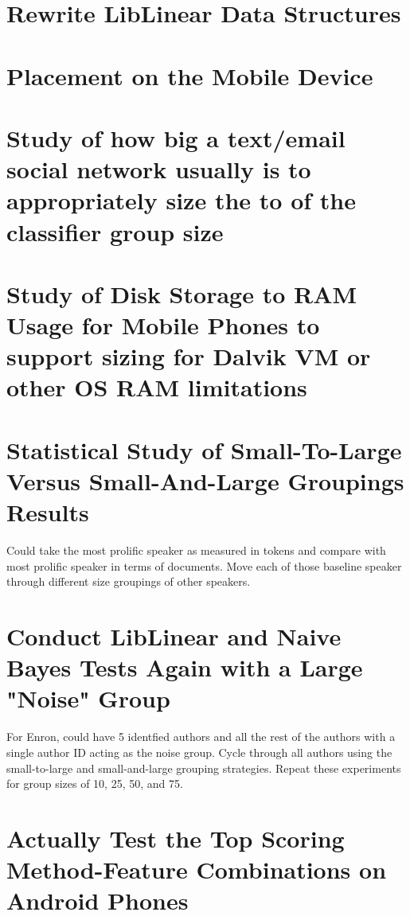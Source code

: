 \section{Rewrite LibLinear Data Structures}

\section{Placement on the Mobile Device}

\section{Study of how big a text/email social network usually is to appropriately size the to of the classifier group size}

\section{Study of Disk Storage to RAM Usage for Mobile Phones to support sizing for Dalvik VM or other OS RAM limitations}

\section{Statistical Study of Small-To-Large Versus Small-And-Large Groupings Results}
Could take the most prolific speaker as measured in tokens and compare with most prolific speaker in terms of documents.  Move each of those baseline speaker through different size groupings of other speakers.

\section{Conduct LibLinear and Naive Bayes Tests Again with a Large "Noise" Group}
For Enron, could have 5 identfied authors and all the rest of the authors with a single author ID acting as the noise group.  Cycle through all authors using the small-to-large and small-and-large grouping strategies.  Repeat these experiments for group sizes of 10, 25, 50, and 75.

\section{Actually Test the Top Scoring Method-Feature Combinations on Android Phones}
\paragraph{} 


